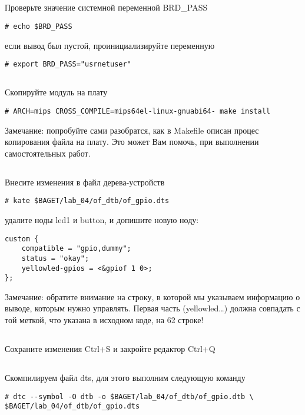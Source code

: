 \subsection{}Проверьте значение системной переменной BRD\_PASS  
\begin{lstlisting}[style=bash]
# echo $BRD_PASS
\end{lstlisting}
если вывод был пустой, проинициализируйте переменную 
\begin{lstlisting}[style=bash]
# export BRD_PASS="usrnetuser" 
\end{lstlisting}

\subsection{}Скопируйте модуль на плату
\begin{lstlisting}[style=bash]
	# ARCH=mips CROSS_COMPILE=mips64el-linux-gnuabi64- make install
\end{lstlisting}
Замечание: попробуйте сами разобратся, как в Makefile описан процес копирования файла на плату. Это может Вам помочь, при выполнении самостоятельных работ.

\subsection{}Внесите изменения в файл дерева-устройств 
\begin{lstlisting}[style=bash]
# kate $BAGET/lab_04/of_dtb/of_gpio.dts
\end{lstlisting}
удалите ноды led1 и button, и допишите новую ноду:
\begin{lstlisting}[style=stdout]
custom {
	compatible = "gpio,dummy";
	status = "okay";
	yellowled-gpios = <&gpiof 1 0>;
};
\end{lstlisting}
Замечание: обратите внимание на строку, в которой мы указываем информацию о выводе, которым нужно управлять. Первая часть (yellowled…) должна совпадать с той меткой, что указана в исходном коде, на 62 строке!

\subsection{}Сохраните изменения Ctrl+S и закройте редактор Ctrl+Q 

\subsection{}Скомпилируем файл dts, для этого выполним следующую команду
\begin{lstlisting}[style=bash]
# dtc --symbol -O dtb -o $BAGET/lab_04/of_dtb/of_gpio.dtb \
$BAGET/lab_04/of_dtb/of_gpio.dts
\end{lstlisting}

